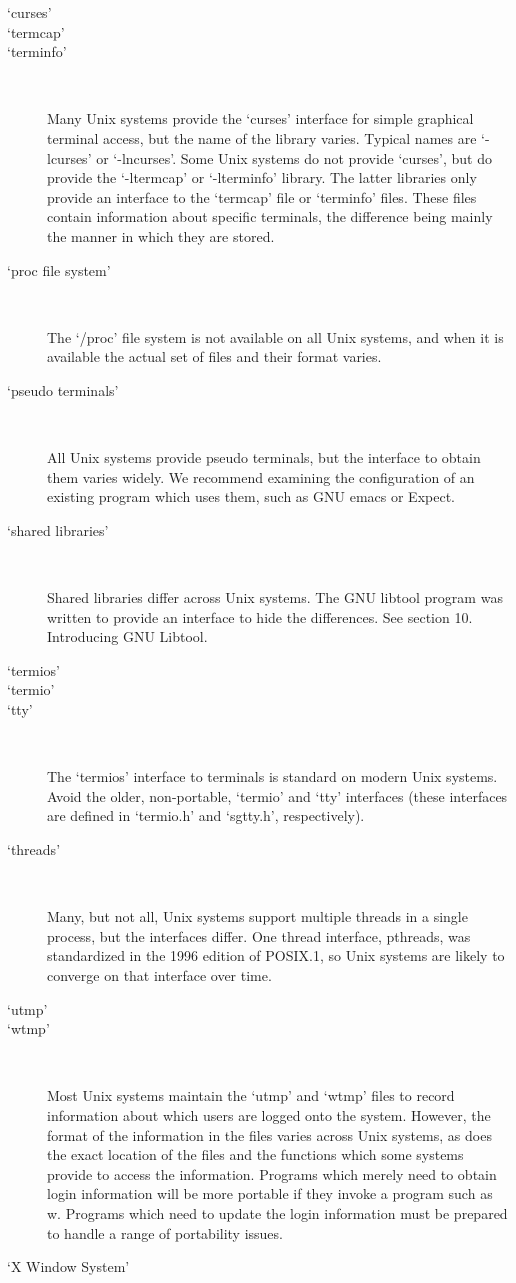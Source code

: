 \begin{description}
\item[`curses']
\item[`termcap']
\item[`terminfo']
\

    Many Unix systems provide the `curses' interface for simple graphical terminal access, but the name of the library varies. Typical names are `-lcurses' or `-lncurses'. Some Unix systems do not provide `curses', but do provide the `-ltermcap' or `-lterminfo' library. The latter libraries only provide an interface to the `termcap' file or `terminfo' files. These files contain information about specific terminals, the difference being mainly the manner in which they are stored. 
\item[`proc file system']
\

    The `/proc' file system is not available on all Unix systems, and when it is available the actual set of files and their format varies. 
\item[`pseudo terminals']
\

    All Unix systems provide pseudo terminals, but the interface to obtain them varies widely. We recommend examining the configuration of an existing program which uses them, such as GNU emacs or Expect. 
\item[`shared libraries']
\

    Shared libraries differ across Unix systems. The GNU libtool program was written to provide an interface to hide the differences. See section 10. Introducing GNU Libtool. 
\item[`termios']
\item[`termio']
\item[`tty']
\

    The `termios' interface to terminals is standard on modern Unix systems. Avoid the older, non-portable, `termio' and `tty' interfaces (these interfaces are defined in `termio.h' and `sgtty.h', respectively). 
\item[`threads']
\

    Many, but not all, Unix systems support multiple threads in a single process, but the interfaces differ. One thread interface, pthreads, was standardized in the 1996 edition of POSIX.1, so Unix systems are likely to converge on that interface over time. 
\item[`utmp']
\item[`wtmp']
\

    Most Unix systems maintain the `utmp' and `wtmp' files to record information about which users are logged onto the system. However, the format of the information in the files varies across Unix systems, as does the exact location of the files and the functions which some systems provide to access the information. Programs which merely need to obtain login information will be more portable if they invoke a program such as w. Programs which need to update the login information must be prepared to handle a range of portability issues. 
\item[`X Window System']
\


\end{description}
